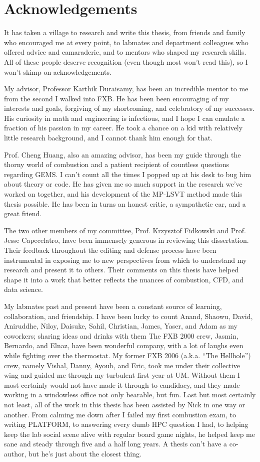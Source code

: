 \chapter{Acknowledgements}

It has taken a village to research and write this thesis, from friends and family who encouraged me at every point, to labmates and department colleagues who offered advice and camaraderie, and to mentors who shaped my research skills. All of these people deserve recognition (even though most won't read this), so I won't skimp on acknowledgements.

My advisor, Professor Karthik Duraisamy, has been an incredible mentor to me from the second I walked into FXB. He has been been encouraging of my interests and goals, forgiving of my shortcoming, and celebratory of my successes. His curiosity in math and engineering is infectious, and I hope I can emulate a fraction of his passion in my career. He took a chance on a kid with relatively little research background, and I cannot thank him enough for that.

Prof. Cheng Huang, also an amazing advisor, has been my guide through the thorny world of combustion and a patient recipient of countless questions regarding GEMS. I can't count all the times I popped up at his desk to bug him about theory or code. He has given me so much support in the research we've worked on together, and his development of the MP-LSVT method made this thesis possible. He has been in turns an honest critic, a sympathetic ear, and a great friend.

The two other members of my committee, Prof. Krzysztof Fidkowski and Prof. Jesse Capecelatro, have been immensely generous in reviewing this dissertation. Their feedback throughout the editing and defense process have been instrumental in exposing me to new perspectives from which to understand my research and present it to others. Their comments on this thesis have helped shape it into a work that better reflects the nuances of combustion, CFD, and data science.

My labmates past and present have been a constant source of learning, collaboration, and friendship. I have been lucky to count Anand, Shaowu, David, Aniruddhe, Niloy, Daisuke, Sahil, Christian, James, Yaser, and Adam as my coworkers; sharing ideas and drinks with them  The FXB 2000 crew, Jasmin, Bernardo, and Elnaz, have been wonderful company, with a lot of laughs even while fighting over the thermostat. My former FXB 2006 (a.k.a. ``The Hellhole'') crew, namely Vishal, Danny, Ayoub, and Eric, took me under their collective wing and guided me through my turbulent first year at UM. Without them I most certainly would not have made it through to candidacy, and they made working in a windowless office not only bearable, but fun. Last but most certainly not least, all of the work in this thesis has been assisted by Nick in one way or another. From calming me down after I failed my first combustion exam, to writing PLATFORM, to answering every dumb HPC question I had, to helping keep the lab social scene alive with regular board game nights, he helped keep me sane and steady through five and a half long years. A thesis can't have a co-author, but he's just about the closest thing.

